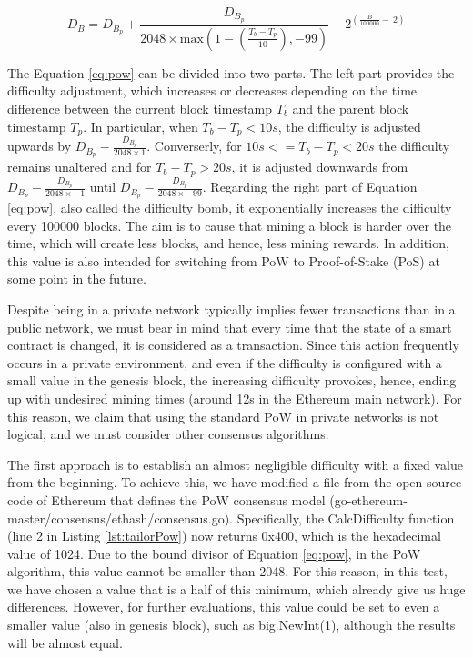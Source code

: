\begin{equation} \label{eq:pow}
 D_B = D_{B_p} + \frac{D_{B_p}}{2048 \times \text{max}(1-(\frac{T_b - T_p}{10}), -99)} + 2^{(\frac{B}{100000} - \ 2)} 
  \end{equation}

The Equation \ref{eq:pow} can be divided into two parts. The left part provides the difficulty adjustment, which increases or decreases depending on the time difference between the current block timestamp $T_b$ and the parent block timestamp $T_p$. In particular, when $T_b - T_p < 10s$, the difficulty is adjusted upwards by $D_{B_p} - \frac{D_{B_p}}{2048 \times 1}$. Converserly, for $10s <= T_b - T_p < 20s$ the difficulty remains unaltered and for $T_b - T_p > 20s$, it is adjusted downwards from $D_{B_p} - \frac{D_{B_p}}{2048 \times -1}$ until $D_{B_p} - \frac{D_{B_p}}{2048 \times -99}$. Regarding the right part of Equation \ref{eq:pow}, also called the difficulty bomb, it exponentially increases the difficulty every 100000 blocks. The aim is to cause that mining a block is harder over the time, which will create less blocks, and hence, less mining rewards. In addition, this value is also intended for switching from PoW to Proof-of-Stake (PoS) at some point in the future.

Despite being in a private network typically implies fewer transactions than in a public network, we must bear in mind that every time that the state of a smart contract is changed, it is considered as a transaction. Since this action frequently occurs in a private environment, and even if the difficulty is configured with a small value in the genesis block, the increasing difficulty provokes, hence, ending up with undesired mining times (around 12s in the Ethereum main network). For this reason, we claim that using the standard PoW in private networks is not logical, and we must consider other consensus algorithms.

The first approach is to establish an almost negligible difficulty with a fixed value from the beginning. To achieve this, we have modified a file from the open source code of Ethereum that defines the PoW consensus model (go-ethereum-master/consensus/ethash/consensus.go). Specifically, the CalcDifficulty function (line 2 in Listing \ref{lst:tailorPow}) now returns 0x400, which is the hexadecimal value of 1024. Due to the bound divisor of Equation \ref{eq:pow}, in the PoW algorithm, this value cannot be smaller than 2048. For this reason, in this test, we have chosen a value that is a half of this minimum, which already give us huge differences. However, for further evaluations, this value could be set to even a smaller value (also in genesis block), such as big.NewInt(1), although the results will be almost equal.

